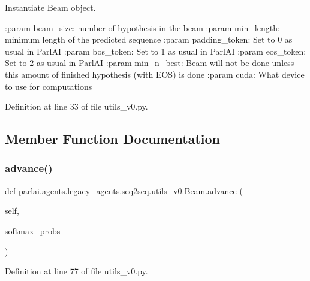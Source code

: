 \begin{DoxyVerb}Instantiate Beam object.

:param beam_size: number of hypothesis in the beam
:param min_length: minimum length of the predicted sequence
:param padding_token: Set to 0 as usual in ParlAI
:param bos_token: Set to 1 as usual in ParlAI
:param eos_token: Set to 2 as usual in ParlAI
:param min_n_best: Beam will not be done unless this amount of finished
           hypothesis (with EOS) is done
:param cuda: What device to use for computations
\end{DoxyVerb}
 

Definition at line 33 of file utils\+\_\+v0.\+py.



\subsection{Member Function Documentation}
\mbox{\label{classparlai_1_1agents_1_1legacy__agents_1_1seq2seq_1_1utils__v0_1_1Beam_ad45cf956539e1b9cdb38e6ebb2514843}} 
\subsubsection{\texorpdfstring{advance()}{advance()}}
{\footnotesize\ttfamily def parlai.\+agents.\+legacy\+\_\+agents.\+seq2seq.\+utils\+\_\+v0.\+Beam.\+advance (\begin{DoxyParamCaption}\item[{}]{self,  }\item[{}]{softmax\+\_\+probs }\end{DoxyParamCaption})}



Definition at line 77 of file utils\+\_\+v0.\+py.



